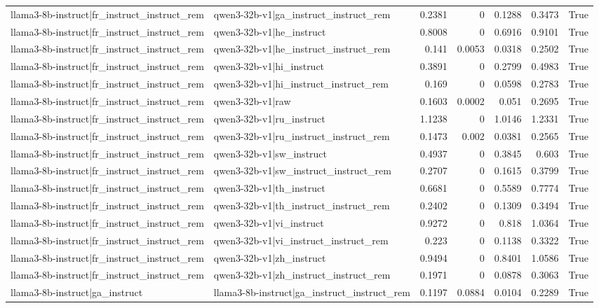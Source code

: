 \begin{table}
\begin{tabular}{l l r r r r l}
llama3-8b-instruct|fr_instruct_instruct_rem & qwen3-32b-v1|ga_instruct_instruct_rem & 0.2381 & 0 & 0.1288 & 0.3473 & True \\
llama3-8b-instruct|fr_instruct_instruct_rem & qwen3-32b-v1|he_instruct & 0.8008 & 0 & 0.6916 & 0.9101 & True \\
llama3-8b-instruct|fr_instruct_instruct_rem & qwen3-32b-v1|he_instruct_instruct_rem & 0.141 & 0.0053 & 0.0318 & 0.2502 & True \\
llama3-8b-instruct|fr_instruct_instruct_rem & qwen3-32b-v1|hi_instruct & 0.3891 & 0 & 0.2799 & 0.4983 & True \\
llama3-8b-instruct|fr_instruct_instruct_rem & qwen3-32b-v1|hi_instruct_instruct_rem & 0.169 & 0 & 0.0598 & 0.2783 & True \\
llama3-8b-instruct|fr_instruct_instruct_rem & qwen3-32b-v1|raw & 0.1603 & 0.0002 & 0.051 & 0.2695 & True \\
llama3-8b-instruct|fr_instruct_instruct_rem & qwen3-32b-v1|ru_instruct & 1.1238 & 0 & 1.0146 & 1.2331 & True \\
llama3-8b-instruct|fr_instruct_instruct_rem & qwen3-32b-v1|ru_instruct_instruct_rem & 0.1473 & 0.002 & 0.0381 & 0.2565 & True \\
llama3-8b-instruct|fr_instruct_instruct_rem & qwen3-32b-v1|sw_instruct & 0.4937 & 0 & 0.3845 & 0.603 & True \\
llama3-8b-instruct|fr_instruct_instruct_rem & qwen3-32b-v1|sw_instruct_instruct_rem & 0.2707 & 0 & 0.1615 & 0.3799 & True \\
llama3-8b-instruct|fr_instruct_instruct_rem & qwen3-32b-v1|th_instruct & 0.6681 & 0 & 0.5589 & 0.7774 & True \\
llama3-8b-instruct|fr_instruct_instruct_rem & qwen3-32b-v1|th_instruct_instruct_rem & 0.2402 & 0 & 0.1309 & 0.3494 & True \\
llama3-8b-instruct|fr_instruct_instruct_rem & qwen3-32b-v1|vi_instruct & 0.9272 & 0 & 0.818 & 1.0364 & True \\
llama3-8b-instruct|fr_instruct_instruct_rem & qwen3-32b-v1|vi_instruct_instruct_rem & 0.223 & 0 & 0.1138 & 0.3322 & True \\
llama3-8b-instruct|fr_instruct_instruct_rem & qwen3-32b-v1|zh_instruct & 0.9494 & 0 & 0.8401 & 1.0586 & True \\
llama3-8b-instruct|fr_instruct_instruct_rem & qwen3-32b-v1|zh_instruct_instruct_rem & 0.1971 & 0 & 0.0878 & 0.3063 & True \\
llama3-8b-instruct|ga_instruct & llama3-8b-instruct|ga_instruct_instruct_rem & 0.1197 & 0.0884 & 0.0104 & 0.2289 & True \\

\end{tabular}
\end{table}
